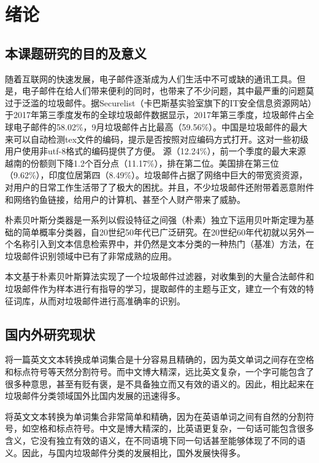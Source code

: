 \documentclass[UTF8,zihao=-4]{ctexart}
\begin{document}
\linespread{1.25}
\tableofcontents
\newpage

\songti{}
\section{绪论}
\subsection{本课题研究的目的及意义}
随着互联网的快速发展，电子邮件逐渐成为人们生活中不可或缺的通讯工具。但是，电子邮件在给人们带来便利的同时，也带来了不少问题，其中最严重的问题莫过于泛滥的垃圾邮件。据Securelist（卡巴斯基实验室旗下的IT安全信息资源网站）于2017年第三季度发布的全球垃圾邮件数据显示，2017年第三季度，垃圾邮件占全球电子邮件的58.02\%，9月垃圾邮件占比最高（59.56\%）。中国是垃圾邮件的最大来可以自动检测tex文件的编码，提示是否按照对应编码方式打开。这对一些初级用户使用非utf-8格式的编码提供了方便。
源（12.24\%），前一个季度的最大来源越南的份额则下降1.2个百分点（11.17\%），排在第二位。美国排在第三位（9.62\%），印度位居第四（8.49\%）。垃圾邮件占据了网络中巨大的带宽资资源，对用户的日常工作生活带了了极大的困扰。并且，不少垃圾邮件还附带着恶意附件和网络钓鱼链接，给用户的计算机、甚至个人财产带来了威胁。

朴素贝叶斯分类器是一系列以假设特征之间强（朴素）独立下运用贝叶斯定理为基础的简单概率分类器，自20世纪50年代已广泛研究。在20世纪60年代初就以另外一个名称引入到文本信息检索界中，并仍然是文本分类的一种热门（基准）方法，在垃圾邮件识别领域中已有了非常成熟的应用。

本文基于朴素贝叶斯算法实现了一个垃圾邮件过滤器，对收集到的大量合法邮件和垃圾邮件作为样本进行有指导的学习，提取邮件的主题与正文，建立一个有效的特征词库，从而对垃圾邮件进行高准确率的识别。

\subsection{国内外研究现状}

将一篇英文文本转换成单词集合是十分容易且精确的，因为英文单词之间存在空格和标点符号等天然分割符号。而中文博大精深，远比英文复杂，一个字可能包含了很多种意思，甚至有贬有褒，是不具备独立而又有效的语义的。因此，相比起来在垃圾邮件分类领域国外比国内发展的迅速得多。

将英文文本转换为单词集合非常简单和精确，因为在英语单词之间有自然的分割符号，如空格和标点符号。中文是博大精深的，比英语更复杂，一句话可能包含很多含义，它没有独立有效的语义，在不同语境下同一句话甚至能够体现了不同的语义。因此，与国内垃圾邮件分类的发展相比，国外发展快得多。
\end{document}
